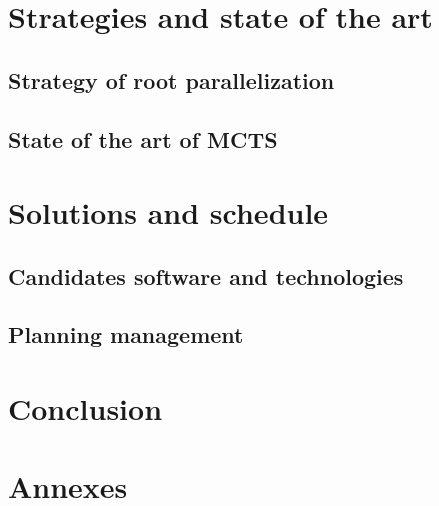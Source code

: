 \documentclass[12pt]{article}
\begin{document}
\newpage
\section{Strategies and state of the art}
\subsection{Strategy of root parallelization}
\subsection{State of the art of MCTS}

\newpage
\section{Solutions and schedule}
\subsection{Candidates software and technologies}
\subsection {Planning management} 
\newpage
\section*{Conclusion}

\newpage
\section{Annexes}
\newpage


\end{document}
